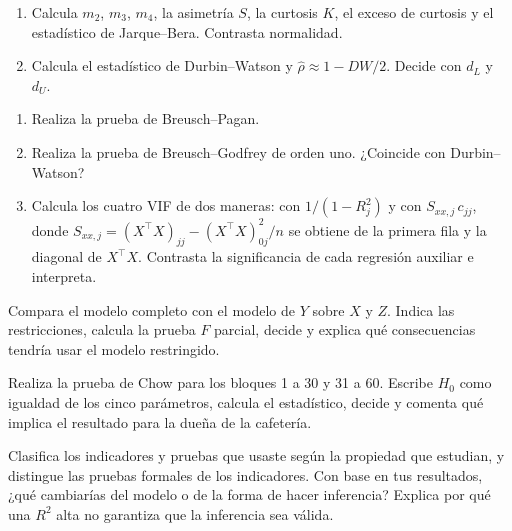 \begin{enumerate}
  \item Calcula $m_2$, $m_3$, $m_4$, la asimetría $S$, la curtosis $K$, el exceso de curtosis y el estadístico de Jarque--Bera. Contrasta normalidad.
  \item Calcula el estadístico de Durbin--Watson y $\hat\rho\approx1-DW/2$. Decide con $d_L$ y $d_U$.
\end{enumerate}


\begin{enumerate}
  \item Realiza la prueba de Breusch--Pagan.
  \item Realiza la prueba de Breusch--Godfrey de orden uno. ¿Coincide con Durbin--Watson?
  \item Calcula los cuatro VIF de dos maneras: con $1/(1-R_j^2)$ y con $S_{xx,j}\,c_{jj}$, donde $S_{xx,j}=(X^\top X)_{jj}-(X^\top X)_{0j}^2/n$ se obtiene de la primera fila y la diagonal de $X^\top X$. Contrasta la significancia de cada regresión auxiliar e interpreta.
\end{enumerate}


Compara el modelo completo con el modelo de $Y$ sobre $X$ y $Z$. Indica las restricciones, calcula la prueba $F$ parcial, decide y explica qué consecuencias tendría usar el modelo restringido.


Realiza la prueba de Chow para los bloques 1 a 30 y 31 a 60. Escribe $H_0$ como igualdad de los cinco parámetros, calcula el estadístico, decide y comenta qué implica el resultado para la dueña de la cafetería.


Clasifica los indicadores y pruebas que usaste según la propiedad que estudian, y distingue las pruebas formales de los indicadores. Con base en tus resultados, ¿qué cambiarías del modelo o de la forma de hacer inferencia? Explica por qué una $R^2$ alta no garantiza que la inferencia sea válida.

